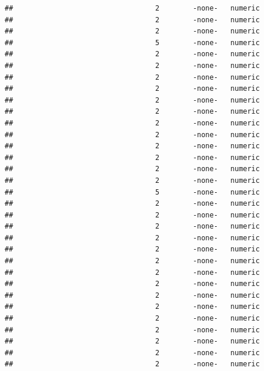 \documentclass[
  12pt,
]{article}
\begin{document}
\begin{verbatim}
##                                  2        -none-   numeric                    
##                                  2        -none-   numeric                    
##                                  2        -none-   numeric                    
##                                  5        -none-   numeric                    
##                                  2        -none-   numeric                    
##                                  2        -none-   numeric                    
##                                  2        -none-   numeric                    
##                                  2        -none-   numeric                    
##                                  2        -none-   numeric                    
##                                  2        -none-   numeric                    
##                                  2        -none-   numeric                    
##                                  2        -none-   numeric                    
##                                  2        -none-   numeric                    
##                                  2        -none-   numeric                    
##                                  2        -none-   numeric                    
##                                  2        -none-   numeric                    
##                                  5        -none-   numeric                    
##                                  2        -none-   numeric                    
##                                  2        -none-   numeric                    
##                                  2        -none-   numeric                    
##                                  2        -none-   numeric                    
##                                  2        -none-   numeric                    
##                                  2        -none-   numeric                    
##                                  2        -none-   numeric                    
##                                  2        -none-   numeric                    
##                                  2        -none-   numeric                    
##                                  2        -none-   numeric                    
##                                  2        -none-   numeric                    
##                                  2        -none-   numeric                    
##                                  2        -none-   numeric                    
##                                  2        -none-   numeric                    
##                                  2        -none-   numeric                    

\end{verbatim}
\end{document}
